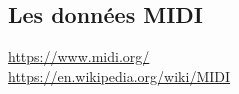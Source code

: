 \subsection{Les données MIDI}
\url{https://www.midi.org/}\\
\url{https://en.wikipedia.org/wiki/MIDI}